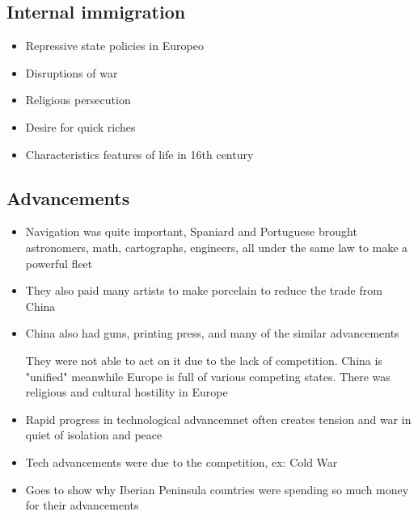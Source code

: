 \documentclass{article}
\begin{document}
\subsection{Internal immigration}
\begin{itemize}
  \item Repressive state policies in Europeo
  \item Disruptions of war
  \item Religious persecution
  \item Desire for quick riches
  \item Characteristics features of life in 16th century
\end{itemize}

\subsection{Advancements}
\begin{itemize}
  \item Navigation was quite important, Spaniard and Portuguese
    brought astronomers, math, cartographs, engineers, all
    under the same law to make a powerful fleet
  \item They also paid many artists to make porcelain to reduce the trade from China
  \item China also had guns, printing press, and many of the similar advancements

    They were not able to act on it due to the lack of competition.
    China is "unified" meanwhile Europe is full of various competing states.
    There was religious and cultural hostility in Europe
  \item Rapid progress in technological advancemnet often creates
    tension and war in quiet of isolation and peace
  \item Tech advancements were due to the competition, ex: Cold War
  \item Goes to show why Iberian Peninsula countries were spending so much
    money for their advancements
\end{itemize}
\end{document}
